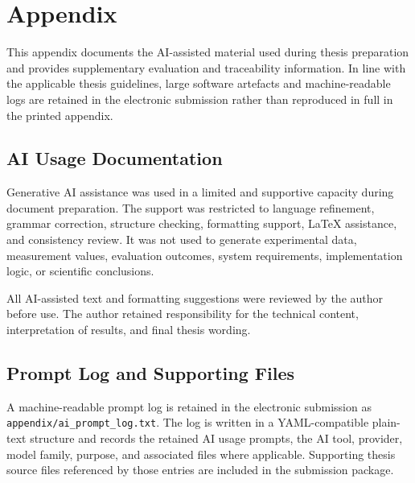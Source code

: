 \appendix
\chapter*{Appendix}
\label{app:supplementary-materials}

\setcounter{section}{0}
\renewcommand{\thesection}{A.\arabic{section}}
\renewcommand{\thesubsection}{A.\arabic{section}.\arabic{subsection}}
\renewcommand{\thesubsubsection}{A.\arabic{section}.\arabic{subsection}.\arabic{subsubsection}}

This appendix documents the AI-assisted material used during thesis preparation
and provides supplementary evaluation and traceability information. In line
with the applicable thesis guidelines, large software artefacts and
machine-readable logs are retained in the electronic submission rather than
reproduced in full in the printed appendix.

\section{AI Usage Documentation}
\label{app:ai-usage}

Generative AI assistance was used in a limited and supportive capacity during
document preparation. The support was restricted to language refinement,
grammar correction, structure checking, formatting support, LaTeX assistance,
and consistency review. It was not used to generate experimental data,
measurement values, evaluation outcomes, system requirements, implementation
logic, or scientific conclusions.

All AI-assisted text and formatting suggestions were reviewed by the author
before use. The author retained responsibility for the technical content,
interpretation of results, and final thesis wording.

\section{Prompt Log and Supporting Files}
\label{app:prompt-log}

A machine-readable prompt log is retained in the electronic submission as
\texttt{appendix/ai\_prompt\_log.txt}. The log is written in a
YAML-compatible plain-text structure and records the retained AI usage prompts,
the AI tool, provider, model family, purpose, and associated files where
applicable. Supporting thesis source files referenced by those entries are
included in the submission package.

